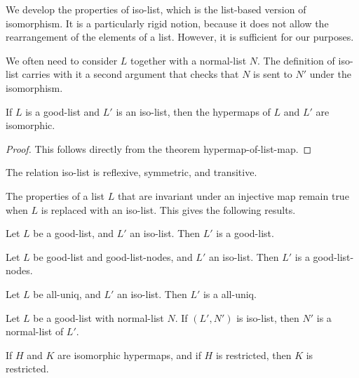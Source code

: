 We develop the properties of iso-list, which is the list-based version of isomorphism.
It is a particularly rigid notion, because it does not allow the rearrangement of the elements of a list.
However, it is sufficient for our purposes.

We often need to consider $L$ together with a normal-list $N$.  The definition of iso-list carries with it
a second argument that checks that $N$ is sent to $N'$ under the isomorphism.

\begin{lemma}
If $L$ is a good-list and $L'$ is an iso-list, then the hypermaps of $L$ and $L'$ are isomorphic.
\end{lemma}

\begin{proof} This follows directly from the theorem hypermap-of-list-map.
\end{proof}

\begin{lemma}  
The relation iso-list is reflexive, symmetric, and transitive.
\end{lemma}

The properties of a list $L$ that are invariant under an injective map remain true when $L$ is replaced
with an iso-list.  This gives the following results.

\begin{lemma}
Let $L$ be a good-list, and $L'$ an iso-list.  Then $L'$ is a good-list.
\end{lemma}

\begin{lemma}
Let $L$ be good-list and good-list-nodes, and $L'$ an iso-list.  Then $L'$ is a good-list-nodes.
\end{lemma}

\begin{lemma} 
Let $L$ be all-uniq, and $L'$ an iso-list.  Then $L'$ is a all-uniq.
\end{lemma}

\begin{lemma}
 Let $L$ be a good-list with normal-list $N$.  If $(L',N')$ is iso-list, then $N'$ is a normal-list of $L'$.
\end{lemma}

\begin{lemma}
If $H$ and $K$ are isomorphic hypermaps, and if $H$ is restricted, then $K$ is restricted.
\end{lemma}

